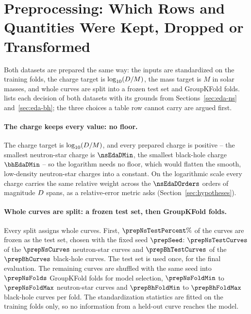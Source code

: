\section{Preprocessing: Which Rows and Quantities Were Kept, Dropped or Transformed}
\label{sec:preprocessing}

Both datasets are prepared the same way: the inputs are standardized on the training folds, the charge target is $\log_{10}(D/M)$, the mass target is $M$ in solar masses, and whole curves are split into a frozen test set and GroupKFold folds.  lists each decision of both datasets with its grounds from Sections~\ref{sec:eda-ns} and~\ref{sec:eda-bh}; the three choices a table row cannot carry are argued first.

\paragraph{The charge keeps every value: no floor.}
The charge target is $\log_{10}(D/M)$, and every prepared charge is positive -- the smallest neutron-star charge is $\nsEdaDMin$, the smallest black-hole charge $\bhEdaDMin$ -- so the logarithm needs no floor, which would flatten the smooth, low-density neutron-star charges into a constant. On the logarithmic scale every charge carries the same relative weight across the $\nsEdaDOrders$ orders of magnitude $D$ spans, as a relative-error metric asks (Section~\ref{sec:hypotheses}).

\paragraph{Whole curves are split: a frozen test set, then GroupKFold folds.}
Every split assigns whole curves. First, $\prepNsTestPercent\%$ of the curves are frozen as the test set, chosen with the fixed seed $\prepSeed$: $\prepNsTestCurves$ of the $\prepNsCurves$ neutron-star curves and $\prepBhTestCurves$ of the $\prepBhCurves$ black-hole curves. The test set is used once, for the final evaluation. The remaining curves are shuffled with the same seed into $\prepNsFolds$ GroupKFold folds for model selection, $\prepNsFoldMin$ to $\prepNsFoldMax$ neutron-star curves and $\prepBhFoldMin$ to $\prepBhFoldMax$ black-hole curves per fold. The standardization statistics are fitted on the training folds only, so no information from a held-out curve reaches the model.

